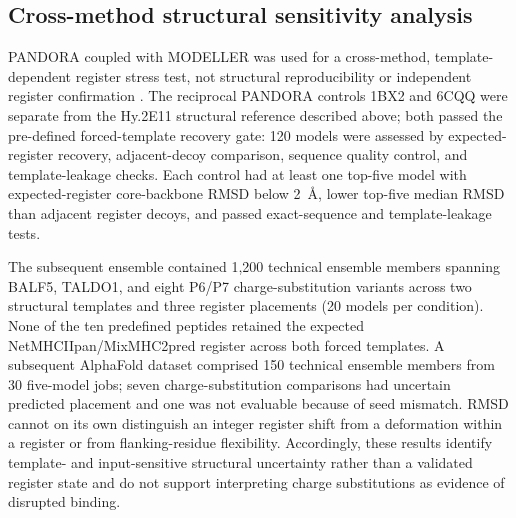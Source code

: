 \documentclass[11pt]{article}
\begin{document}
\subsection{Cross-method structural sensitivity analysis}
PANDORA coupled with MODELLER was used for a cross-method, template-dependent register stress test, not structural reproducibility or independent register confirmation \cite{pandora,modeller}. The reciprocal PANDORA controls 1BX2 and 6CQQ were separate from the Hy.2E11 structural reference described above; both passed the pre-defined forced-template recovery gate: 120 models were assessed by expected-register recovery, adjacent-decoy comparison, sequence quality control, and template-leakage checks. Each control had at least one top-five model with expected-register core-backbone RMSD below 2~\AA{}, lower top-five median RMSD than adjacent register decoys, and passed exact-sequence and template-leakage tests.

The subsequent ensemble contained 1,200 technical ensemble members spanning BALF5, TALDO1, and eight P6/P7 charge-substitution variants across two structural templates and three register placements (20 models per condition). None of the ten predefined peptides retained the expected NetMHCIIpan/MixMHC2pred register across both forced templates. A subsequent AlphaFold dataset comprised 150 technical ensemble members from 30 five-model jobs; seven charge-substitution comparisons had uncertain predicted placement and one was not evaluable because of seed mismatch. RMSD cannot on its own distinguish an integer register shift from a deformation within a register or from flanking-residue flexibility. Accordingly, these results identify template- and input-sensitive structural uncertainty rather than a validated register state and do not support interpreting charge substitutions as evidence of disrupted binding.
\end{document}
